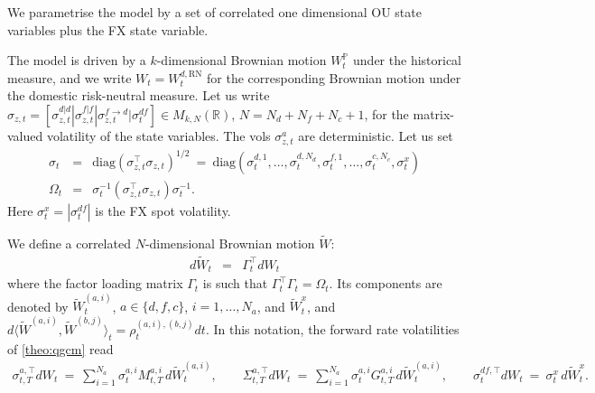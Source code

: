 \documentclass[11pt,english]{amsart}
\newcommand{\diag}{\mathrm{diag}}
\newcommand{\RN}{\mathrm{RN}}
\newcommand{\PP}{\mathbb{P}}
\newcommand{\RR}{\mathbb{R}}
\theoremstyle{definition}
\begin{document}
We parametrise the model by a set of correlated one dimensional OU state variables plus the FX state variable.

The model is driven by a $k$-dimensional Brownian motion $W^\PP_t$ under the historical measure, and we write $W_t = W^{d,\RN}_t$ for the corresponding Brownian motion under the domestic risk-neutral measure.
Let us write $\sigma_{z,t} = [\sigma^{d|d}_{z,t} | \sigma^{f|f}_{z,t} | \sigma^{f\to d}_{z,t} | \sigma^{df}_{t} ] \in M_{k,N}(\RR)$, $N = N_d + N_f + N_c + 1$, for the matrix-valued volatility of the state variables. The vols $\sigma^{a}_{z,t}$ are deterministic. Let us set
\begin{eqnarray}
  \sigma_{t}  &=& \diag\left( \sigma_{z,t}^\top \sigma_{z,t} \right)^{1/2} ~=~ \diag\left(\sigma^{d,1}_t,\ldots,\sigma^{d,N_d}_t,\sigma^{f,1}_t,\ldots,\sigma^{c,N_c}_t,\sigma^{x}_t\right) \\
  \Omega_t  &=& \sigma_{t}^{-1}\left( \sigma_{z,t}^\top \sigma_{z,t} \right)\sigma_{t}^{-1} .
\end{eqnarray}
Here $\sigma^{x}_t = |\sigma^{df}_t|$ is the FX spot volatility.

We define a correlated $N$-dimensional Brownian motion $\widetilde{W}$:
\begin{eqnarray}
  d\widetilde{W}_t  &=& \Gamma_t^\top dW_t
\end{eqnarray}
where the factor loading matrix $\Gamma_t$ is such that $\Gamma_t^\top\Gamma_t = \Omega_t$. Its components are denoted by $\widetilde{W}^{(a,i)}_t$, $a\in\{d,f,c\}$, $i=1,\ldots,N_a$, and $\widetilde{W}^x_t$, and $d\langle \widetilde{W}^{(a,i)},\widetilde{W}^{(b,j)}\rangle_t = \rho^{(a,i),(b,j)}_t dt$. In this notation, the forward rate volatilities of \autoref{theo:qgcm} read
\begin{eqnarray}
  \sigma^{a,\top}_{t,T} dW_t ~=~ \sum_{i=1}^{N_a} \sigma^{a,i}_t M^{a,i}_{t,T} \, d\widetilde{W}^{(a,i)}_t , \qquad
  \Sigma^{a,\top}_{t,T} dW_t ~=~ \sum_{i=1}^{N_a} \sigma^{a,i}_t G^{a,i}_{t,T} \, d\widetilde{W}^{(a,i)}_t , \qquad
  \sigma^{df,\top}_t dW_t ~=~ \sigma^x_t \, d\widetilde{W}^x_t .
\end{eqnarray}
\end{document}
